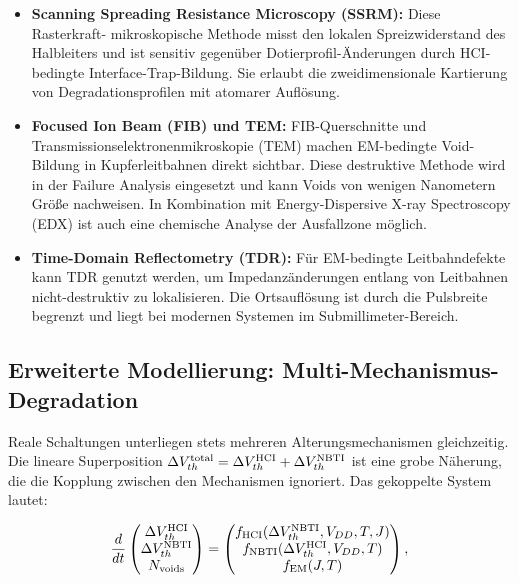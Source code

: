 ﻿\documentclass[a4paper,12pt]{article}
\theoremstyle{definition}
\begin{document}
\begin{itemize}
	      schwache Licht, das von heißen Trägern im Kanalbereich emittiert wird.
	      Diese Methode erlaubt die direkte Visualisierung von HCI-Aktivität mit
	      Sub-Mikrometer-Auflösung und ist daher das präziseste Werkzeug zur
	      Pfadidentifikation~\cite{nikawa1992}. Die emittierte Photondichte ist
	      proportional zur Zahl der heißen Träger:
	      $\Phi \propto I_D \cdot \exp(-\phi_{it} / q\lambda \mathcal{E}_{\rm max})$.
	      Durch ortsaufgelöste EMMI-Aufnahmen mit einer InGaAs-Kamera können
	      einzelne Transistoren als Emitter identifiziert werden.
	\item \textbf{Scanning Spreading Resistance Microscopy (SSRM):} Diese Rasterkraft-
	      mikroskopische Methode misst den lokalen Spreizwiderstand des Halbleiters
	      und ist sensitiv gegenüber Dotierprofil-Änderungen durch HCI-bedingte
	      Interface-Trap-Bildung. Sie erlaubt die zweidimensionale Kartierung von
	      Degradationsprofilen mit atomarer Auflösung.
	\item \textbf{Focused Ion Beam (FIB) und TEM:} FIB-Querschnitte und
	      Transmissionselektronenmikroskopie (TEM) machen EM-bedingte Void-Bildung
	      in Kupferleitbahnen direkt sichtbar. Diese destruktive Methode wird in der
	      Failure Analysis eingesetzt und kann Voids von wenigen Nanometern Größe
	      nachweisen. In Kombination mit Energy-Dispersive X-ray Spectroscopy (EDX)
	      ist auch eine chemische Analyse der Ausfallzone möglich.
	\item \textbf{Time-Domain Reflectometry (TDR):} Für EM-bedingte Leitbahndefekte
	      kann TDR genutzt werden, um Impedanzänderungen entlang von Leitbahnen
	      nicht-destruktiv zu lokalisieren. Die Ortsauflösung ist durch die
	      Pulsbreite begrenzt und liegt bei modernen Systemen im Submillimeter-Bereich.
\end{itemize}

\subsection{Erweiterte Modellierung: Multi-Mechanismus-Degradation}
\label{sub:multi}

Reale Schaltungen unterliegen stets mehreren Alterungsmechanismen gleichzeitig.
Die lineare Superposition $\Delta V_{th}^{\rm total} = \Delta V_{th}^{\rm HCI}
+ \Delta V_{th}^{\rm NBTI}$ ist eine grobe Näherung, die die Kopplung zwischen
den Mechanismen ignoriert. Das gekoppelte System lautet:

\[
\frac{d}{dt}\begin{pmatrix} \Delta V_{th}^{\rm HCI} \\ \Delta V_{th}^{\rm NBTI} \\
N_{\rm voids} \end{pmatrix}
= \begin{pmatrix}
f_{\rm HCI}(\Delta V_{th}^{\rm NBTI}, V_{DD}, T, J) \\
f_{\rm NBTI}(\Delta V_{th}^{\rm HCI}, V_{DD}, T) \\
f_{\rm EM}(J, T)
\end{pmatrix},
\]
\end{document}
